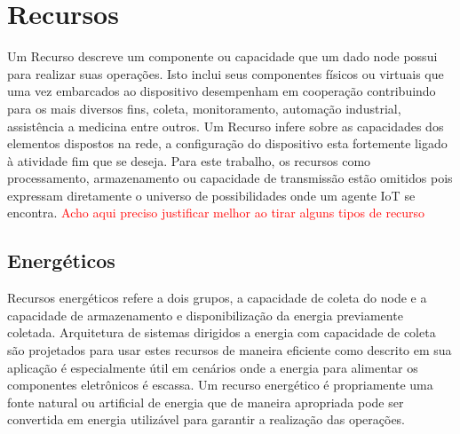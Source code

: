 \section{Recursos}

Um Recurso descreve um componente ou capacidade que um dado node possui para realizar suas operações. Isto inclui seus componentes físicos ou virtuais que uma vez embarcados ao dispositivo desempenham em cooperação contribuindo para os mais diversos fins, coleta, monitoramento, automação industrial, assistência a medicina entre outros. Um Recurso infere sobre as capacidades dos elementos dispostos na rede, a configuração do dispositivo esta fortemente ligado à atividade fim que se deseja. Para este trabalho, os recursos como processamento, armazenamento ou capacidade de transmissão estão omitidos pois expressam diretamente o universo de possibilidades onde um agente \acs{IoT} se encontra. \textcolor{red}{Acho aqui preciso justificar melhor ao tirar alguns tipos de recurso}



\subsection{Energéticos}

Recursos energéticos refere a dois grupos, a capacidade de coleta do node e a capacidade de armazenamento e disponibilização da energia previamente coletada. Arquitetura de sistemas dirigidos a energia com capacidade de coleta são projetados para usar estes recursos de maneira eficiente como descrito em \cite{prauzek_energy_2018} sua aplicação é especialmente útil em cenários onde a energia para alimentar os componentes eletrônicos é escassa. Um recurso energético é propriamente uma fonte natural ou artificial de energia que de maneira apropriada pode ser convertida em energia utilizável para garantir a realização das operações. 

